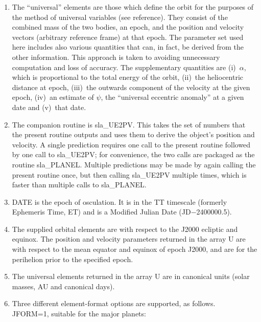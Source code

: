 \documentclass[11pt,twoside]{article}
\begin{document}
{
 \begin{enumerate}
  \item The ``universal'' elements are those which define the orbit for
        the purposes of the method of universal variables (see reference).
        They consist of the combined mass of the two bodies, an epoch,
        and the position and velocity vectors (arbitrary reference frame)
        at that epoch.  The parameter set used here includes also various
        quantities that can, in fact, be derived from the other
        information.  This approach is taken to avoiding unnecessary
        computation and loss of accuracy.  The supplementary quantities
        are (i)~$\alpha$, which is proportional to the total energy of the
        orbit, (ii)~the heliocentric distance at epoch,
        (iii)~the outwards component of the velocity at the given epoch,
        (iv)~an estimate of $\psi$, the ``universal eccentric anomaly'' at a
        given date and (v)~that date.
  \item The companion routine is sla\_UE2PV.  This takes the set of numbers
        that the present routine outputs and uses them to derive the
        object's position and velocity.  A single prediction requires one
        call to the present routine followed by one call to sla\_UE2PV;
        for convenience, the two calls are packaged as the routine
        sla\_PLANEL.  Multiple predictions may be made by again calling the
        present routine once, but then calling sla\_UE2PV multiple times,
        which is faster than multiple calls to sla\_PLANEL.
  \item DATE is the epoch of osculation.  It is in the TT timescale
        (formerly Ephemeris Time, ET) and is a Modified Julian Date
        (JD$-$2400000.5).
  \item The supplied orbital elements are with respect to the J2000
        ecliptic and equinox.  The position and velocity parameters
        returned in the array U are with respect to the mean equator and
        equinox of epoch J2000, and are for the perihelion prior to the
        specified epoch.
  \item The universal elements returned in the array U are in canonical
        units (solar masses, AU and canonical days).
  \item Three different element-format options are supported, as
        follows. \\

        JFORM=1, suitable for the major planets:


\end{enumerate}}
\end{document}
